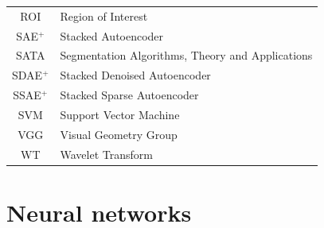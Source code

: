 \documentclass[journal]{IEEEtran}
\begin{document}
\begin{table}[!t]
\begin{minipage}{0.5\textwidth}
\begin{tabularx}{\textwidth}{c l}
			ROI                                                                                                                                                            & Region of Interest                                        \\
			SAE$^+$                                                                                                                                                        & Stacked Autoencoder                                       \\
			SATA                                                                                                                                                           & Segmentation Algorithms, Theory and Applications          \\
			SDAE$^+$                                                                                                                                                       & Stacked Denoised Autoencoder                              \\
			SSAE$^+$                                                                                                                                                       & Stacked Sparse Autoencoder                                \\
			SVM                                                                                                                                                            & Support Vector Machine                                    \\
			VGG                                                                                                                                                            & Visual Geometry Group                                     \\
			WT                                                                                                                                                             & Wavelet Transform                                         \\
			\bottomrule
		\end{tabularx}
	\end{minipage}
\end{table}

\section{Neural networks}
\label{sec:neuralnetworks}
\end{document}
